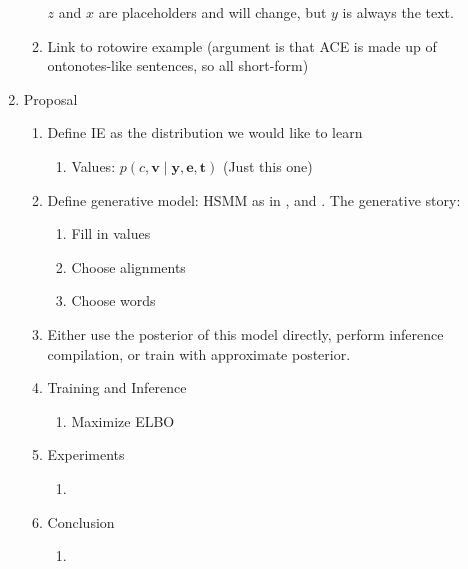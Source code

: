 \documentclass[11pt]{article}
\newcommand{\be}{\mathbf{e}}
\newcommand{\br}{\mathbf{r}}
\newcommand{\bt}{\mathbf{t}}
\newcommand{\bv}{\mathbf{v}}
\newcommand{\by}{\mathbf{y}}
\begin{document}
\begin{enumerate}
\begin{enumerate}
        $z$ and $x$ are placeholders and will change, but $y$ is always the text.
    \item Link to rotowire example
        (argument is that ACE is made up of ontonotes-like sentences, so all short-form)
    \end{enumerate}
\item Proposal
    \begin{enumerate}
    \item Define IE as the distribution we would like to learn
        \begin{enumerate}
        \item Values: $p(c,\bv\mid\by,\be,\bt)$ (Just this one)
        \end{enumerate}
    \item Define generative model: HSMM as in \citep{liang2009semalign},
        and \citep{wiseman2018template}.
        The generative story:
        \begin{enumerate}
        \item Fill in values
        \item Choose alignments
        \item Choose words
        \end{enumerate}
    \item Either use the posterior of this model directly,
        perform inference compilation, or train with approximate posterior.
    \item Training and Inference
        \begin{enumerate}
        \item Maximize ELBO
        \end{enumerate}
    \item Experiments
        \begin{enumerate}
        \item 
        \end{enumerate}
    \item Conclusion
        \begin{enumerate}
        \item 
        \end{enumerate}
    \end{enumerate}
\end{enumerate}



\end{document}
